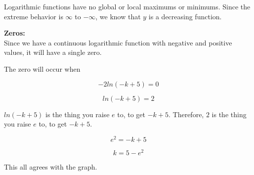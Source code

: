 \documentclass{ximera}
\begin{document}
\begin{exercise}
Logarithmic functions have no global or local maximums or minimums. Since the extreme behavior is $\infty$ to $-\infty$, we know that $y$ is a decreasing function.




\textbf{\textcolor{blue!55!black}{Zeros:}}  \\


Since we have a continuous logarithmic function with negative and positive values, it will have a single zero.


The zero will occur when 

\[
-2 ln(-k+5) = 0
\]

\[
ln(-k+5) = 2
\]



$ln(-k+5)$ is the thing you raise $e$ to, to get $-k+5$. Therefore, $2$ is the thing you raise $e$ to, to get $-k+5$. 

\[
e^2 = -k + 5
\]


\[
k = 5 - e^2 
\]



This all agrees with the graph.


\begin{image}
\end{image}















\end{exercise}
\end{document}
